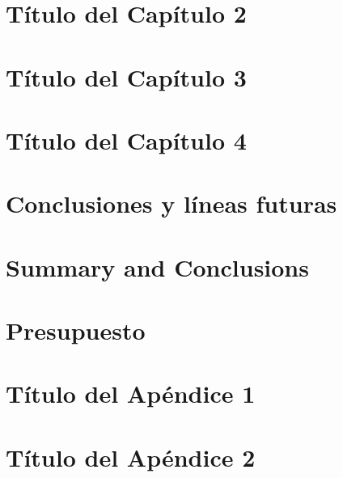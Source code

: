 \documentclass[spanish,a4paper,12pt,oneside]{scrbook}
\begin{document}


\chapter{Título del Capítulo 2}
\label{chapter:dos}



\chapter{Título del Capítulo 3}
\label{chapter:tres}



\chapter{Título del Capítulo 4}
\label{chapter:cuatro}



\chapter{Conclusiones y líneas futuras}
\label{chapter:Resultados}



\chapter{Summary and Conclusions}
\label{chapter:Conclusiones}



\chapter{Presupuesto}
\label{chapter:presupuesto}



\appendix

\chapter{Título del Apéndice 1}
\label{appendix:1}


\chapter{Título del Apéndice 2}
\label{appendix:2}


\backmatter

\end{document}
